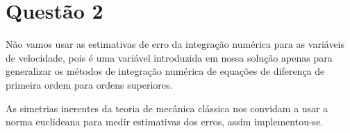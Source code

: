 \documentclass[12pt,runningheads]{article}
\begin{document}
\newpage

\section{Questão 2}
Não vamos usar as estimativas de erro da integração numérica para as variáveis de velocidade, pois é uma variável introduzida em nossa solução apenas para generalizar os métodos de integração numérica de equações de diferença de primeira ordem para ordens superiores.

As simetrias inerentes da teoria de mecânica clássica nos convidam a usar a norma euclideana para medir estimativas dos erros, assim implementou-se.
\end{document}
